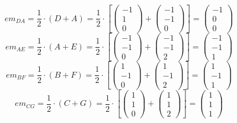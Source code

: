 \documentclass{article}
\begin{document}
\[em_{DA}=\frac{1}{2}\cdot(D+A)=\frac{1}{2}\cdot\left[
\left({\begin{array}{c} -1 \\  1 \\ 0 \end{array}}\right)+
\left({\begin{array}{c} -1 \\  -1 \\ 0 \end{array}}\right)\right]=
\left({\begin{array}{c}  -1 \\ 0 \\ 0 \end{array}}\right)
\]
\[em_{AE}=\frac{1}{2}\cdot(A+E)=\frac{1}{2}\cdot\left[
\left({\begin{array}{c} -1 \\  -1 \\ 0 \end{array}}\right)+
\left({\begin{array}{c} -1 \\  -1 \\ 2 \end{array}}\right)\right]=
\left({\begin{array}{c} -1 \\ -1 \\ 1 \end{array}}\right)
\]
\[em_{BF}=\frac{1}{2}\cdot(B+F)=\frac{1}{2}\cdot\left[
\left({\begin{array}{c} 1 \\  -1 \\ 0 \end{array}}\right)+
\left({\begin{array}{c} 1 \\  -1 \\ 2 \end{array}}\right)\right]=
\left({\begin{array}{c} 1 \\ -1 \\ 1 \end{array}}\right)
\]
\[em_{CG}=\frac{1}{2}\cdot(C+G)=\frac{1}{2}\cdot\left[
\left({\begin{array}{c} 1 \\  1 \\ 0 \end{array}}\right)+
\left({\begin{array}{c} 1 \\  1 \\ 2 \end{array}}\right)\right]=
\left({\begin{array}{c} 1 \\ 1 \\ 1 \end{array}}\right)
\]
\end{document}
